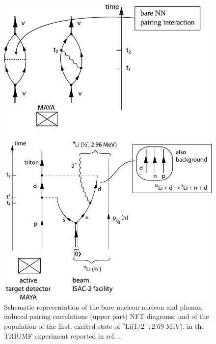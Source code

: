  \begin{figure}
 \centerline{\includegraphics*[width=15cm,angle=0]{C8/figsC8/fig8_1_1}}
 	\caption{Schematic representation of the bare nucleon-nucleon and phonon induced pairing correlations (upper part) NFT diagrams, and of the population of the first, excited state of $^{9}$Li($1/2^{-}; 2.69$ MeV), in the TRIUMF experiment  reported in ref. \cite{Tanihata:08}.}\label{fig8_1_1}
 \end{figure}

